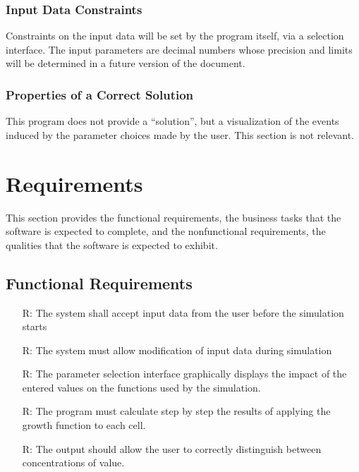 \documentclass[12pt]{article}
\newcounter{reqnum} %
\begin{document}
\subsubsection{Input Data Constraints} \label{sec_DataConstraints}    

Constraints on the input data will be set by the program itself, via a selection interface. The input parameters are decimal numbers whose precision and limits will be determined in a future version of the document.


\subsubsection{Properties of a Correct Solution} \label{sec_CorrectSolution}

This program does not provide a ``solution'', but a visualization of the events induced by the parameter choices made by the user. This section is not relevant.

\section{Requirements}

This section provides the functional requirements, the business tasks that the
software is expected to complete, and the nonfunctional requirements, the
qualities that the software is expected to exhibit.

\subsection{Functional Requirements}

\noindent \begin{itemize}

\item[R\refstepcounter{reqnum}\thereqnum \label{R_Inputs}:] The system shall accept input data from the user before the simulation starts

\item[R\refstepcounter{reqnum}\thereqnum \label{R_Inputs}:] The system must allow modification of input data during simulation

\item[R\refstepcounter{reqnum}\thereqnum \label{R_Selection}:] The parameter selection interface graphically displays the impact of the entered values on the functions used by the simulation.

\item[R\refstepcounter{reqnum}\thereqnum \label{R_Calculate}:] The program must calculate step by step the results of applying the growth function to each cell.

\item[R\refstepcounter{reqnum}\thereqnum \label{R_Output}:] The output should allow the user to correctly distinguish between concentrations of value.

\end{itemize}
\end{document}
